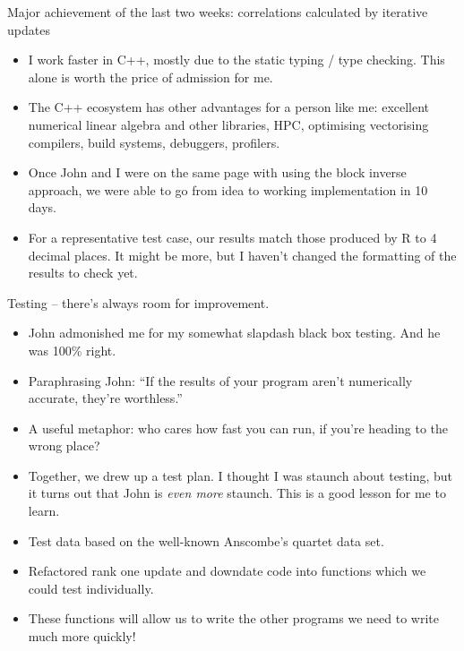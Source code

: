 \documentclass{beamer}
\begin{document}
\begin{frame}{Major achievement of the last two weeks: correlations calculated by iterative updates}
\begin{itemize}
\item I work faster in C++, mostly due to the static typing / type checking. This alone is worth the price of 
			admission for me.
\item The C++ ecosystem has other advantages for a person like me: excellent numerical linear algebra 
			and other libraries, HPC, optimising vectorising compilers, build systems, debuggers, profilers.
\item Once John and I were on the same page with using the block inverse approach, we were able to go from 
			idea to working implementation in 10 days.
\item For a representative test case, our results match those produced by R to 4 decimal places. It might be 
			more, but I haven't changed the formatting of the results to check yet.
\end{itemize}
\end{frame}

\begin{frame}{Testing -- there's always room for improvement.}
\begin{itemize}
\item John admonished me for my somewhat slapdash black box testing. And he was 100\% right.
\item Paraphrasing John: ``If the results of your program aren't numerically accurate, they're worthless.''
\item A useful metaphor: who cares how fast you can run, if you're heading to the wrong place?
\item Together, we drew up a test plan. I thought I was staunch about testing, but it turns out that John is
\emph{even more} staunch. This is a good lesson for me to learn.
\item Test data based on the well-known Anscombe's quartet data set.
\item Refactored rank one update and downdate code into functions which we could test individually.
\item These functions will allow us to write the other programs we need to write much more quickly!
\end{itemize}
\end{frame}
\end{document}
